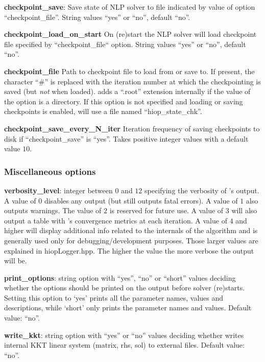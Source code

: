 \noindent \textbf{checkpoint\_save}: Save state of NLP solver to file indicated by value of option ``checkpoint\_file''. String values ``yes'' or ``no'', default ``no''.

\noindent \textbf{checkpoint\_load\_on\_start} On (re)start the NLP solver will load checkpoint file specified by ``checkpoint\_file`` option. String values ``yes'' or ``no'', default ``no''.

\noindent \textbf{checkpoint\_file} Path to checkpoint file to load from or save to. If present, the character ``\#'' is replaced with the iteration number at which the checkpointing is saved (but \textit{not} when loaded). \Hi adds a ``.root'' extension internally if the value of the option is a directory. If this option is not specified and loading or saving checkpoints is enabled, \Hi will use a file named ``hiop\_state\_chk''.

\noindent \textbf{checkpoint\_save\_every\_N\_iter} Iteration frequency of saving checkpoints to disk if ``checkpoint\_save'' is ``yes''. Takes positive integer values with a default value $10$.


\subsubsection{Miscellaneous options}

\noindent \textbf{verbosity\_level}: integer between $0$ and $12$ specifying the verbosity of \Hi's output. A value of $0$ disables any output (but still outputs fatal errors). A value of $1$ also outputs warnings. The value of $2$ is reserved for future use. A value of $3$ will also output a table with \Hi's convergence metrics at each iteration. A value of $4$ and higher will display additional info related to the internals of the algorithm and is generally used only for debugging/development purposes. Those larger values are explained in hiopLogger.hpp. The higher the value the more verbose the output will be.
\medskip

\noindent \textbf{print\_options}: string option with ``yes'', ``no'' or ``short'' values deciding whether the options should be printed on the output before solver (re)starts. Setting this option to `yes' prints all the parameter names, values and descriptions, while `short' only prints the parameter names and values. Default value: ``no''.
\medskip

\noindent \textbf{write\_kkt}: string option with ``yes'' or ``no'' values deciding whether \Hi writes internal KKT linear system (matrix, rhs, sol) to external files. Default value: ``no''.
\medskip

